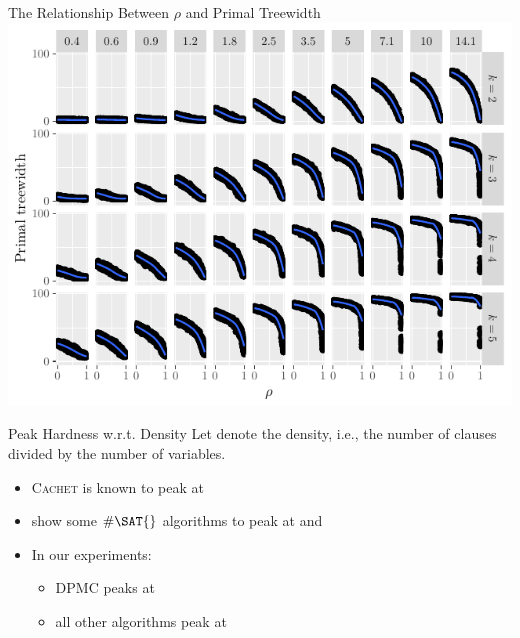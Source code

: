 \documentclass{beamer}
\begin{document}
\begin{frame}{The Relationship Between \alert{$\rho$} and Primal Treewidth}
  \includegraphics{regular_repetitiveness.pdf}
\end{frame}


\begin{frame}{Peak Hardness w.r.t. Density}
  Let \structure{$\mu$} denote the \alert{density}, i.e., the number of clauses
  divided by the number of variables.
  \begin{itemize}
    \item \textsc{Cachet} is known to peak at 
          \textcolor{gray}{\parencite{DBLP:conf/sat/SangBBKP04}}
    \item \textcolor{gray}{\textcite{DBLP:conf/aaai/Pehoushek00}} show some
          $\#\SAT{}$ algorithms to peak at  and
          \pause
    \item In our experiments:
    \begin{itemize}
      \item \textsc{DPMC} peaks at 
      \item all other algorithms peak at 
    \end{itemize}
  \end{itemize}
\end{frame}
\end{document}
